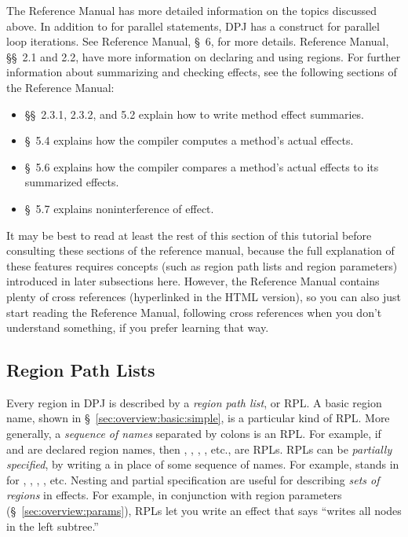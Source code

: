 The Reference Manual has more detailed information on the topics
discussed above.  In addition to  for parallel
statements, DPJ has a  construct for parallel loop
iterations.  See Reference Manual, \S~6, for more details.  Reference
Manual, \S\S~2.1 and 2.2, have more information on declaring and using
regions.  For further information about summarizing and checking
effects, see the following sections of the Reference Manual:
%
\begin{itemize}
%
\item 
\S\S~2.3.1, 2.3.2, and 5.2 explain how to write method effect summaries.
%
\item
\S~5.4 explains how the compiler computes a method's actual effects.
%
\item
\S~5.6 explains how the compiler compares a method's actual effects to
its summarized effects.
%
\item
\S~5.7 explains noninterference of effect.
\end{itemize}
%
It may be best to read at least the rest of this section of this
tutorial before consulting these sections of the reference manual,
because the full explanation of these features requires concepts (such
as region path lists and region parameters) introduced in later
subsections here.  However, the Reference Manual contains plenty of
cross references (hyperlinked in the HTML version), so you can also
just start reading the Reference Manual, following cross references
when you don't understand something, if you prefer learning that way.

\subsection{Region Path Lists%
\label{sec:overview:rpls}}

Every region in DPJ is described by a \emph{region path list}, or RPL.
A basic region name, shown in \S~\ref{sec:overview:basic:simple}, is a
particular kind of RPL.  More generally, a \emph{sequence of names}
separated by colons is an RPL.  For example, if  and 
are declared region names, then , , ,
, etc., are RPLs.  RPLs can be \emph{partially specified},
by writing a \kwd{*} in place of some sequence of names.  For example,
 stands in for , , ,
, etc.  Nesting and partial specification are useful for
describing \emph{sets of regions} in effects.  For example, in
conjunction with region parameters (\S~\ref{sec:overview:params}),
RPLs let you write an effect that says ``writes all nodes in the left
subtree.''

